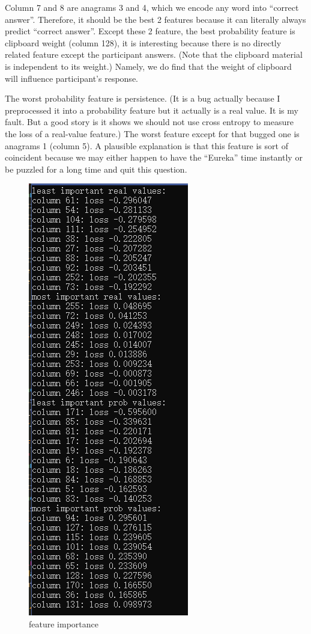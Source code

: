 \documentclass[11pt, a4paper]{article}
\begin{document}
\begin{enumerate}
	\par{Column 7 and 8 are anagrams 3 and 4, which we encode any word into ``correct answer''. Therefore, it should be the best 2 features because it can literally always predict ``correct answer''. Except these 2 feature, the best probability feature is clipboard weight (column 128), it is interesting because there is no directly related feature except the participant answers. (Note that the clipboard material is independent to its weight.) Namely, we do find that the weight of clipboard will influence participant’s response.}
	\par{The worst probability feature is persistence. (It is a bug actually because I preprocessed it into a probability feature but it actually is a real value. It is my fault. But a good story is it shows we should not use cross entropy to measure the loss of a real-value feature.) The worst feature except for that bugged one is anagrams 1 (column 5). A plausible explanation is that this feature is sort of coincident because we may either happen to have the ``Eureka'' time instantly or be puzzled for a long time and quit this question.}
	\begin{figure}[H]
		\centering
		\includegraphics[width=0.4\linewidth]{2.png}
		\caption{feature importance}
		\label{2}
	\end{figure}
	

\end{enumerate}
\end{document}
